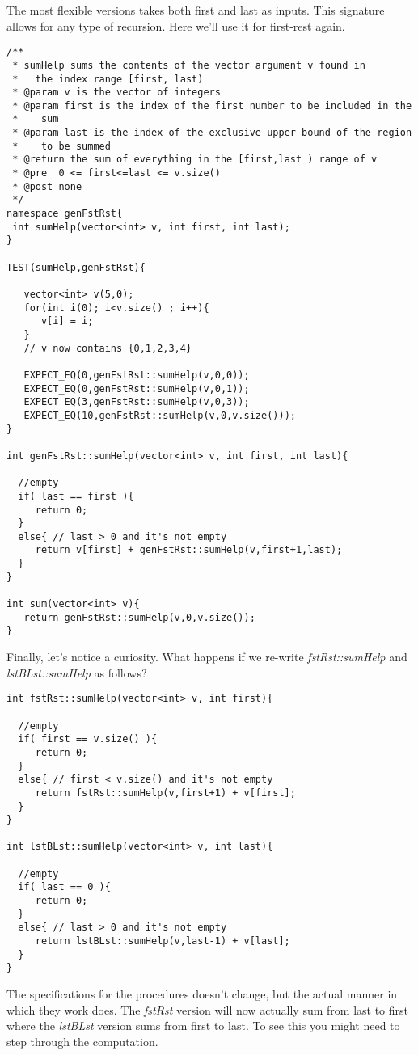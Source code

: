 \documentclass[]{tufte-handout}
\begin{document}
The most flexible versions takes both first and last as inputs.  This signature allows for any type of recursion. Here we'll use it for first-rest again.	
\begin{verbatim}
/**
 * sumHelp sums the contents of the vector argument v found in
 *   the index range [first, last)
 * @param v is the vector of integers
 * @param first is the index of the first number to be included in the
 *    sum
 * @param last is the index of the exclusive upper bound of the region 
 *    to be summed
 * @return the sum of everything in the [first,last ) range of v
 * @pre  0 <= first<=last <= v.size()
 * @post none
 */
namespace genFstRst{
 int sumHelp(vector<int> v, int first, int last);
} 

TEST(sumHelp,genFstRst){

   vector<int> v(5,0);
   for(int i(0); i<v.size() ; i++){
      v[i] = i;		   
   }
   // v now contains {0,1,2,3,4}
   
   EXPECT_EQ(0,genFstRst::sumHelp(v,0,0));
   EXPECT_EQ(0,genFstRst::sumHelp(v,0,1));	
   EXPECT_EQ(3,genFstRst::sumHelp(v,0,3));   
   EXPECT_EQ(10,genFstRst::sumHelp(v,0,v.size()));   
}

int genFstRst::sumHelp(vector<int> v, int first, int last){
 
  //empty
  if( last == first ){
     return 0;
  }
  else{ // last > 0 and it's not empty
     return v[first] + genFstRst::sumHelp(v,first+1,last);
  }    
}

int sum(vector<int> v){
   return genFstRst::sumHelp(v,0,v.size());
}
\end{verbatim}

Finally, let's notice a curiosity.  What happens if we re-write \textit{fstRst::sumHelp} and \textit{lstBLst::sumHelp} as follows?
\begin{verbatim}
int fstRst::sumHelp(vector<int> v, int first){
 
  //empty
  if( first == v.size() ){
     return 0;
  }
  else{ // first < v.size() and it's not empty
     return fstRst::sumHelp(v,first+1) + v[first];
  }    
}

int lstBLst::sumHelp(vector<int> v, int last){
 
  //empty
  if( last == 0 ){
     return 0;
  }
  else{ // last > 0 and it's not empty
     return lstBLst::sumHelp(v,last-1) + v[last];
  }    
}
\end{verbatim}

The specifications for the procedures doesn't change, but the actual manner in which they work does.  The \textit{fstRst} version will now actually sum from last to first where the \textit{lstBLst} version sums from first to last. To see this you might need to step through the computation. 
\end{document}
